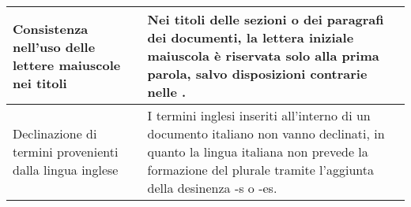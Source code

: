 \begin{adjustwidth}{-0.5cm}{-0.5cm}
\begin{longtable}{|P{4.5cm}|>{\raggedright\arraybackslash}P{9cm}|}
		\hline Consistenza nell'uso delle lettere maiuscole nei titoli & Nei titoli delle sezioni o dei paragrafi dei documenti, la lettera iniziale maiuscola è riservata solo alla prima parola, salvo disposizioni contrarie nelle \NdP. \\
		\hline Declinazione di termini provenienti dalla lingua inglese & I termini inglesi inseriti all'interno di un documento italiano non vanno declinati, in quanto la lingua italiana non prevede la formazione del plurale tramite l'aggiunta della desinenza -s o -es. \\
  \end{longtable}
\end{adjustwidth}
\egroup